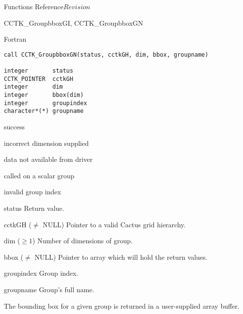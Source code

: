 \begin{cactuspart}{ Functions Reference}{}{$Revision$}
\begin{FunctionDescription}{CCTK\_GroupbboxGI, CCTK\_GroupbboxGN}
\begin{SynopsisSection}
\begin{Synopsis}{Fortran}
\begin{verbatim}
call CCTK_GroupbboxGN(status, cctkGH, dim, bbox, groupname)

integer       status
CCTK_POINTER  cctkGH
integer       dim
integer       bbox(dim)
integer       groupindex
character*(*) groupname
\end{verbatim}
\end{Synopsis}
\end{SynopsisSection}

\begin{ResultSection}
\begin{Result}{0} success \end{Result}
\begin{Result}{-1} incorrect dimension supplied \end{Result}
\begin{Result}{-2} data not available from driver \end{Result}
\begin{Result}{-3} called on a scalar group \end{Result}
\begin{Result}{-4} invalid group index \end{Result}
\end{ResultSection}

\begin{ParameterSection}
\begin{Parameter}{status} Return value. \end{Parameter}
\begin{Parameter}{cctkGH ($\ne$ NULL)} Pointer to a valid Cactus grid hierarchy. \end{Parameter}
\begin{Parameter}{dim ($\ge 1$)} Number of dimensions of group. \end{Parameter}
\begin{Parameter}{bbox ($\ne$ NULL)} Pointer to array which will hold the return values. \end{Parameter}
\begin{Parameter}{groupindex} Group index. \end{Parameter}
\begin{Parameter}{groupname} Group's full name. \end{Parameter}
\end{ParameterSection}

\begin{Discussion}
The bounding box for a given group is returned in a user-supplied array buffer.
\end{Discussion}


\end{FunctionDescription}
\end{cactuspart}
